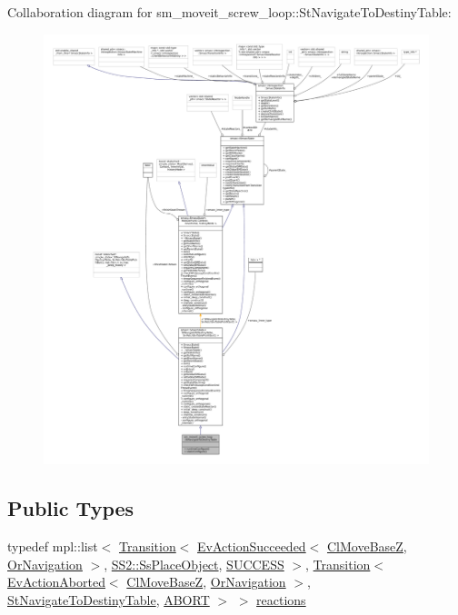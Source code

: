 Collaboration diagram for sm\+\_\+moveit\+\_\+screw\+\_\+loop\+:\+:St\+Navigate\+To\+Destiny\+Table\+:
\nopagebreak
\begin{figure}[H]
\begin{center}
\leavevmode
\includegraphics[width=350pt]{structsm__moveit__screw__loop_1_1StNavigateToDestinyTable__coll__graph}
\end{center}
\end{figure}
\subsection*{Public Types}
\begin{DoxyCompactItemize}
\item 
typedef mpl\+::list$<$ \hyperlink{classsmacc_1_1Transition}{Transition}$<$ \hyperlink{structsmacc_1_1default__events_1_1EvActionSucceeded}{Ev\+Action\+Succeeded}$<$ \hyperlink{classcl__move__base__z_1_1ClMoveBaseZ}{Cl\+Move\+BaseZ}, \hyperlink{classsm__moveit__screw__loop_1_1OrNavigation}{Or\+Navigation} $>$, \hyperlink{structsm__moveit__screw__loop_1_1SS2_1_1SsPlaceObject}{S\+S2\+::\+Ss\+Place\+Object}, \hyperlink{structsmacc_1_1default__transition__tags_1_1SUCCESS}{S\+U\+C\+C\+E\+SS} $>$, \hyperlink{classsmacc_1_1Transition}{Transition}$<$ \hyperlink{structsmacc_1_1default__events_1_1EvActionAborted}{Ev\+Action\+Aborted}$<$ \hyperlink{classcl__move__base__z_1_1ClMoveBaseZ}{Cl\+Move\+BaseZ}, \hyperlink{classsm__moveit__screw__loop_1_1OrNavigation}{Or\+Navigation} $>$, \hyperlink{structsm__moveit__screw__loop_1_1StNavigateToDestinyTable}{St\+Navigate\+To\+Destiny\+Table}, \hyperlink{structsmacc_1_1default__transition__tags_1_1ABORT}{A\+B\+O\+RT} $>$ $>$ \hyperlink{structsm__moveit__screw__loop_1_1StNavigateToDestinyTable_ab2b24433e29ebd167928808ca9dc64b7}{reactions}
\end{DoxyCompactItemize}
